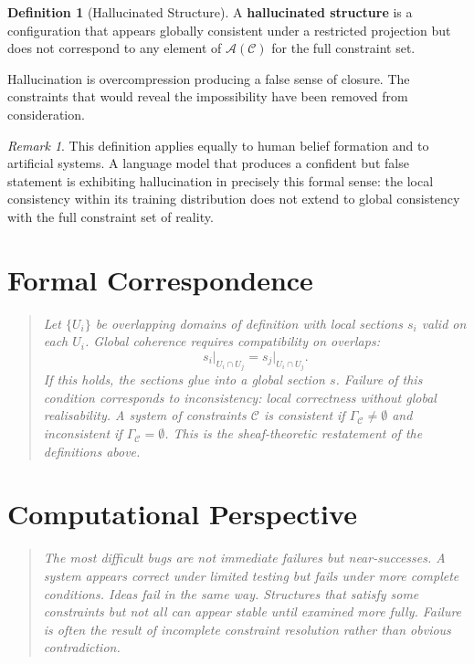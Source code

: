 \documentclass[11pt]{book}
\theoremstyle{plain}
\theoremstyle{definition}
\newtheorem{definition}[theorem]{Definition}
\theoremstyle{remark}
\newtheorem{remark}[theorem]{Remark}
\newcommand{\C}{\mathcal{C}}
\newcommand{\A}{\mathcal{A}}
\newenvironment{formalcorrespondence}
  {\begin{quote}\small\itshape}
  {\end{quote}}
\newenvironment{computationalaside}
  {\begin{quote}\small\itshape}
  {\end{quote}}
\begin{document}
\begin{definition}[Hallucinated Structure]
A \textbf{hallucinated structure} is a configuration that appears globally
consistent under a restricted projection but does not correspond to any
element of $\A(\C)$ for the full constraint set.
\end{definition}

Hallucination is overcompression producing a false sense of closure. The
constraints that would reveal the impossibility have been removed from
consideration.

\begin{remark}
This definition applies equally to human belief formation and to artificial
systems. A language model that produces a confident but false statement is
exhibiting hallucination in precisely this formal sense: the local consistency
within its training distribution does not extend to global consistency with
the full constraint set of reality.
\end{remark}

\section*{Formal Correspondence}
\begin{formalcorrespondence}
Let $\{U_i\}$ be overlapping domains of definition with local sections
$s_i$ valid on each $U_i$. Global coherence requires compatibility on
overlaps:
\[
  s_i\big|_{U_i \cap U_j} = s_j\big|_{U_i \cap U_j}.
\]
If this holds, the sections glue into a global section $s$. Failure of
this condition corresponds to inconsistency: local correctness without
global realisability. A system of constraints $\mathcal{C}$ is consistent
if $\Gamma_{\mathcal{C}} \neq \emptyset$ and inconsistent if
$\Gamma_{\mathcal{C}} = \emptyset$. This is the sheaf-theoretic restatement
of the definitions above.
\end{formalcorrespondence}

\section*{Computational Perspective}
\begin{computationalaside}
The most difficult bugs are not immediate failures but near-successes. A
system appears correct under limited testing but fails under more complete
conditions. Ideas fail in the same way. Structures that satisfy some
constraints but not all can appear stable until examined more fully.
Failure is often the result of incomplete constraint resolution rather
than obvious contradiction.
\end{computationalaside}
\end{document}

